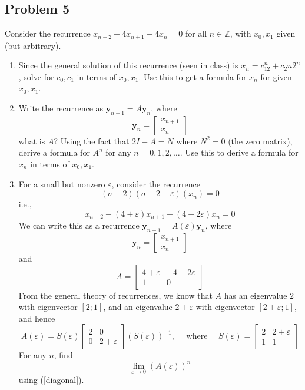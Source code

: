 \documentclass{article}
\newcommand{\Z}{{\mathbb Z}}
\newcommand{\ep}{{\varepsilon}}
\begin{document}
\subsection*{Problem 5}
Consider the recurrence $x_{n+2} - 4x_{n+1} + 4x_n = 0$ for all $n \in \Z$,
with $x_0,x_1$ given (but arbitrary).
\begin{enumerate}
	\item Since the general solution of this recurrence (seen in class)
		is $x_n = c_12^n + c_2n2^n$, solve for $c_0,c_1$ in terms of $x_0,x_1$.
		Use this to get a formula for $x_n$ for given $x_0,x_1$.
	\item Write the recurrence as $\mathbf{y}_{n+1} = A\mathbf{y}_n$, where
		\[
			\mathbf{y}_n = \begin{bmatrix} x_{n+1} \\ x_n \end{bmatrix}
		\]
		what is $A$?
		Using the fact that $2I - A = N$ where $N^2 = 0$ (the zero matrix),
		derive a formula for $A^n$ for any $n = 0,1,2,\dots$.
		Use this to derive a formula for $x_n$ in terms of $x_0,x_1$.
	\item For a small but nonzero $\ep$, consider the recurrence
		\[
			(\sigma - 2)(\sigma - 2 - \ep)(x_n) = 0
		\]
		i.e.,
		\[
			x_{n+2} - (4 + \ep)x_{n+1} + (4+2\ep)x_n = 0
		\]
		We can write this as a recurrence $\mathbf{y}_{n+1} = A(\ep)\mathbf{y}_n$, where
		\[
			\mathbf{y}_n = \begin{bmatrix} x_{n+1} \\ x_n \end{bmatrix}
		\]
		and
		\[
			A = \begin{bmatrix} 4 + \ep & -4-2\ep \\ 1 & 0 \end{bmatrix}
		\]
		From the general theory of recurrences, we know that $A$
		has an eigenvalue $2$ with eigenvector $[2;1]$,
		and an eigenvalue $2 + \ep$ with eigenvector $[2+\ep;1]$, and hence
		\begin{equation}\label{diagonal}
			A(\ep) = S(\ep)\begin{bmatrix} 2 & 0 \\ 0 & 2 + \ep \end{bmatrix}
			(S(\ep))^{-1},
			\quad \text{ where }\quad S(\ep) = \begin{bmatrix} 2 & 2+\ep \\ 1 & 1 \end{bmatrix}
		\end{equation}
		For any $n$, find
		\[
			\lim_{\ep \to 0} (A(\ep))^n
		\]
		using (\ref{diagonal}).

\end{enumerate}
\end{document}

